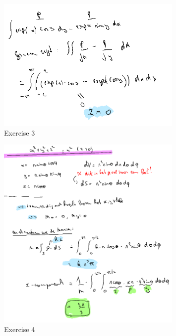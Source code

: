 \documentclass[a4paper]{report}
\begin{document}
\begin{figure}[H]
	\centering
	\includegraphics[width=0.8\textwidth]{assets/huis_7_ex_3.png}
	\caption{Exercise 3}
	\label{fig:huis_7_ex_3}
\end{figure}

\begin{figure}[H]
	\centering
	\includegraphics[width=0.8\textwidth]{assets/huis_7_ex_4.png}
	\caption{Exercise 4}
	\label{fig:huis_7_ex_4}
\end{figure}
\end{document}
